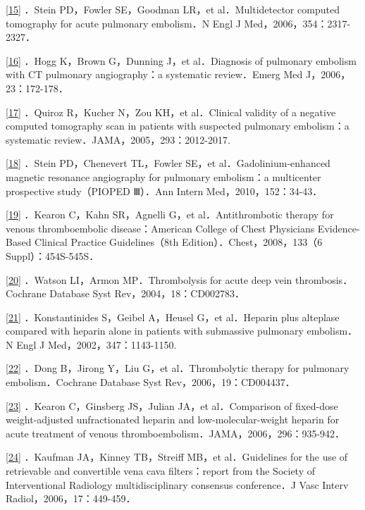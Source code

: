 \protect\hyperlink{text00022.htmlux5cux23ch15-21-back}{{[}15{]}} ．Stein
PD，Fowler SE，Goodman LR，et al．Multidetector computed tomography for
acute pulmonary embolism．N Engl J Med，2006，354：2317-2327．

\protect\hyperlink{text00022.htmlux5cux23ch16-21-back}{{[}16{]}} ．Hogg
K，Brown G，Dunning J，et al．Diagnosis of pulmonary embolism with CT
pulmonary angiography：a systematic review．Emerg Med
J，2006，23：172-178．

\protect\hyperlink{text00022.htmlux5cux23ch17-21-back}{{[}17{]}}
．Quiroz R，Kucher N，Zou KH，et al．Clinical validity of a negative
computed tomography scan in patients with suspected pulmonary
embolism：a systematic review．JAMA，2005，293：2012-2017.

\protect\hyperlink{text00022.htmlux5cux23ch18-21-back}{{[}18{]}} ．Stein
PD，Chenevert TL，Fowler SE，et al．Gadolinium-enhanced magnetic
resonance angiography for pulmonary embolism：a multicenter prospective
study（PIOPED Ⅲ）．Ann Intern Med，2010，152：34-43．

\protect\hyperlink{text00022.htmlux5cux23ch19-21-back}{{[}19{]}}
．Kearon C，Kahn SR，Agnelli G，et al．Antithrombotic therapy for venous
thromboembolic disease：American College of Chest Physicians
Evidence-Based Clinical Practice Guidelines（8th
Edition）．Chest，2008，133（6 Suppl）：454S-545S．

\protect\hyperlink{text00022.htmlux5cux23ch20-21-back}{{[}20{]}}
．Watson LI，Armon MP．Thrombolysis for acute deep vein
thrombosis．Cochrane Database Syst Rev，2004，18：CD002783．

\protect\hyperlink{text00022.htmlux5cux23ch21-21-back}{{[}21{]}}
．Konstantinides S，Geibel A，Heusel G，et al．Heparin plus alteplase
compared with heparin alone in patients with submassive pulmonary
embolism．N Engl J Med，2002，347：1143-1150.

\protect\hyperlink{text00022.htmlux5cux23ch22-21-back}{{[}22{]}} ．Dong
B，Jirong Y，Liu G，et al．Thrombolytic therapy for pulmonary
embolism．Cochrane Database Syst Rev，2006，19：CD004437．

\protect\hyperlink{text00022.htmlux5cux23ch23-21-back}{{[}23{]}}
．Kearon C，Ginsberg JS，Julian JA，et al．Comparison of fixed-dose
weight-adjusted unfractionated heparin and low-molecular-weight heparin
for acute treatment of venous
thromboembolism．JAMA，2006，296：935-942．

\protect\hyperlink{text00022.htmlux5cux23ch24-21-back}{{[}24{]}}
．Kaufman JA，Kinney TB，Streiff MB，et al．Guidelines for the use of
retrievable and convertible vena cava filters：report from the Society
of Interventional Radiology multidisciplinary consensus conference．J
Vasc Interv Radiol，2006，17：449-459．

\protect\hypertarget{text00023.html}{}{}

